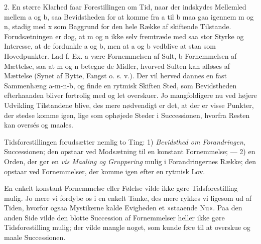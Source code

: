 \documentclass[12pt,a4paper,openany]{book}
\newcommand{\opage}[1]{\marginnote{\footnotesize\textit{[#1]}}}
\begin{document}
2. En større Klarhed faar Forestillingen om Tid, naar der indskydes
Mellemled mellem a og b, saa Bevidstheden for at komme fra a til b maa
gaa igennem m og n, stadig med x som Baggrund for den hele Række af
skiftende Tilstande. Forudsætningen er dog, at m og n ikke selv
fremtræde med saa stor Styrke og Interesse, at de fordunkle a og b, men
at a og b vedblive at staa som Hovedpunkter. Lad f. Ex. a være
Fornemmelsen af Sult, b Fornemmelsen af Mættelse, saa at m og n betegne
de Midler, hvorved Sulten kan afløses af Mættelse (Synet af Bytte,
Fangst o. s. v.). Der vil herved dannes en fast Sammenhæng a-m-n-b, og
finde en rytmisk Skiften Sted, som Bevidstheden efterhaanden bliver
fortrolig med og let overskuer. Jo mangfoldigere nu ved højere Udvikling
Tilstandene blive, des mere nødvendigt er det, at der er visse Punkter,
der stedse komme igen, lige som ophøjede Steder i Successionen, hvorfra
Resten kan oversés og maales.

Tidsforestillingen forudsætter nemlig to Ting: 1) \emph{Bevidsthed om
Forandringen}, Successionen; den opstaar ved Modsætning til en konstant
Fornemmelse; --- 2) en Orden, der gør en \emph{vis Maaling og
Gruppering} mulig i Forandringernes Række; den opstaar ved Fornemmelser,
der komme igen efter en rytmisk Lov.

En enkelt konstant Fornemmelse eller Følelse vilde ikke gøre
Tidsforestilling mulig. Jo mere vi fordybe os i en enkelt Tanke, des
mere rykkes vi ligesom ud af Tiden, hvorfor ogsaa Mystikerne kalde
Evigheden et »staaende Nu«. Paa den anden Side vilde den blotte
Succession af Fornemmelser heller
\opage{229}ikke gøre Tidsforestilling mulig; der vilde mangle noget, som
kunde føre til at overskue og maale Successionen.
\end{document}
